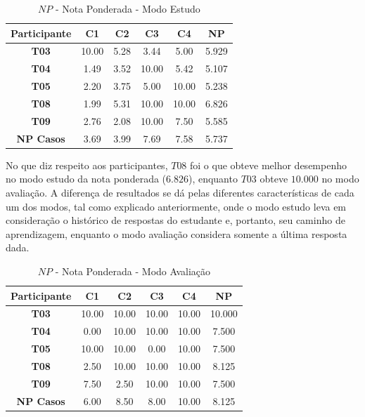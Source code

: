 \begin{table}[htbp]
	\centering
	\caption{$NP$ - Nota Ponderada - Modo Estudo}
	\begin{tabular}{|c|c|c|c|c|c|}
		\hline
		\rowcolor[HTML]{D9D9D9} 
		\textbf{Participante} & \textbf{C1} & \textbf{C2} & \textbf{C3} & \textbf{C4} & \textbf{NP} \\ \hline
		\rowcolor[HTML]{FFFFFF} 
		\textbf{T03} & 10.00 & 5.28 & 3.44 & 5.00 & 5.929 \\ \hline
		\rowcolor[HTML]{E7E6E6} 
		\textbf{T04} & 1.49 & 3.52 & 10.00 & 5.42 & 5.107 \\ \hline
		\rowcolor[HTML]{FFFFFF} 
		\textbf{T05} & 2.20 & 3.75 & 5.00 & 10.00 & 5.238 \\ \hline
		\rowcolor[HTML]{E7E6E6} 
		\textbf{T08} & 1.99 & 5.31 & 10.00 & 10.00 & 6.826 \\ \hline
		\rowcolor[HTML]{FFFFFF} 
		\textbf{T09} & 2.76 & 2.08 & 10.00 & 7.50 & 5.585 \\ \hline
		\rowcolor[HTML]{D9D9D9} 
		\textbf{NP Casos} & 3.69 & 3.99 & 7.69 & 7.58 & 5.737 \\ \hline
	\end{tabular}
	\label{tab:F3_A5_NP_ESTUDO}
\end{table}

No que diz respeito aos participantes, $T08$ foi o que obteve melhor desempenho no modo estudo da nota ponderada ($6.826$), enquanto $T03$ obteve $10.000$ no modo avaliação. A diferença de resultados se dá pelas diferentes características de cada um dos modos, tal como explicado anteriormente, onde o modo estudo leva em consideração o histórico de respostas do estudante e, portanto, seu caminho de aprendizagem, enquanto o modo avaliação considera somente a última resposta dada.

\begin{table}[htbp]
	\centering
	\caption{$NP$ - Nota Ponderada - Modo Avaliação}
	\begin{tabular}{|c|c|c|c|c|c|}
		\hline
		\rowcolor[HTML]{D9D9D9} 
		\textbf{Participante} & \textbf{C1} & \textbf{C2} & \textbf{C3} & \textbf{C4} & \textbf{NP} \\ \hline
		\rowcolor[HTML]{FFFFFF} 
		\textbf{T03} & 10.00 & 10.00 & 10.00 & 10.00 & 10.000 \\ \hline
		\rowcolor[HTML]{E7E6E6} 
		\textbf{T04} & 0.00 & 10.00 & 10.00 & 10.00 & 7.500 \\ \hline
		\rowcolor[HTML]{FFFFFF} 
		\textbf{T05} & 10.00 & 10.00 & 0.00 & 10.00 & 7.500 \\ \hline
		\rowcolor[HTML]{E7E6E6} 
		\textbf{T08} & 2.50 & 10.00 & 10.00 & 10.00 & 8.125 \\ \hline
		\rowcolor[HTML]{FFFFFF} 
		\textbf{T09} & 7.50 & 2.50 & 10.00 & 10.00 & 7.500 \\ \hline
		\rowcolor[HTML]{D9D9D9} 
		\textbf{NP Casos} & 6.00 & 8.50 & 8.00 & 10.00 & 8.125 \\ \hline
	\end{tabular}
	\label{tab:F3_A5_NP_AVALIACAO}
\end{table}


